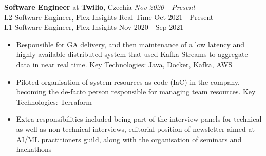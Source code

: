 
{\textbf{Software Engineer} at \textbf{Twilio}, Czechia} 
    \hfill {\em Nov 2020 - Present}\\
    {L2 Software Engineer, Flex Insights Real-Time} \hfill {Oct 2021 - Present}\\
    {L1 Software Engineer, Flex Insights} \hfill {Nov 2020 - Sep 2021}
    \begin{itemize}
        \item Responsible for GA delivery, and then maintenance of a low latency and highly available distributed system that used Kafka Streams to aggregate data in near real time. Key Technologies: Java, Docker, Kafka, AWS
        \item Piloted organisation of system-resources as code (IaC) in the company, becoming the de-facto person responsible for managing team resources. Key Technologies: Terraform
        \item Extra responsibilities included being part of the interview panels for technical as well as non-technical interviews, editorial position of newsletter aimed at AI/ML practitioners guild, along with the organisation of seminars and hackathons
    \end{itemize}